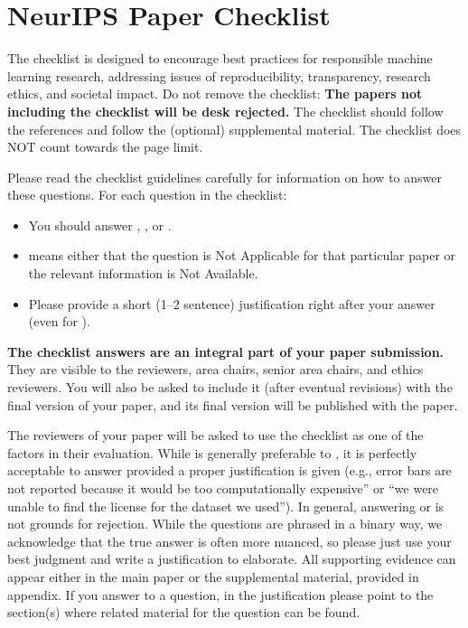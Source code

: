 \documentclass{article}
\theoremstyle{definition}
\begin{document}
\newpage
\section*{NeurIPS Paper Checklist}

The checklist is designed to encourage best practices for responsible machine learning research, addressing issues of reproducibility, transparency, research ethics, and societal impact. Do not remove the checklist: {\bf The papers not including the checklist will be desk rejected.} The checklist should follow the references and follow the (optional) supplemental material.  The checklist does NOT count towards the page
limit. 

Please read the checklist guidelines carefully for information on how to answer these questions. For each question in the checklist:
\begin{itemize}
    \item You should answer \answerYes{}, \answerNo{}, or \answerNA{}.
    \item \answerNA{} means either that the question is Not Applicable for that particular paper or the relevant information is Not Available.
    \item Please provide a short (1--2 sentence) justification right after your answer (even for \answerNA). 
\end{itemize}

{\bf The checklist answers are an integral part of your paper submission.} They are visible to the reviewers, area chairs, senior area chairs, and ethics reviewers. You will also be asked to include it (after eventual revisions) with the final version of your paper, and its final version will be published with the paper.

The reviewers of your paper will be asked to use the checklist as one of the factors in their evaluation. While \answerYes{} is generally preferable to \answerNo{}, it is perfectly acceptable to answer \answerNo{} provided a proper justification is given (e.g., error bars are not reported because it would be too computationally expensive'' or ``we were unable to find the license for the dataset we used''). In general, answering \answerNo{} or \answerNA{} is not grounds for rejection. While the questions are phrased in a binary way, we acknowledge that the true answer is often more nuanced, so please just use your best judgment and write a justification to elaborate. All supporting evidence can appear either in the main paper or the supplemental material, provided in appendix. If you answer \answerYes{} to a question, in the justification please point to the section(s) where related material for the question can be found.
\end{document}
